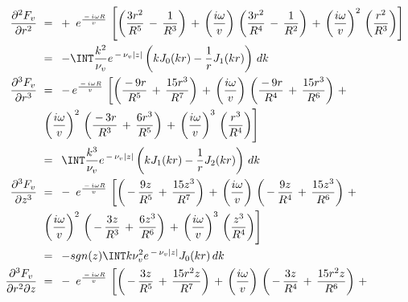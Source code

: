 \documentclass{article}
\begin{document}
\begin{equation*}
\begin{aligned}
{ \frac{ \partial^2 F_v   }{  \partial r^2 } } \   &= \  \,+\,\ { e^{ \frac{ \,-\,i \omega R   }{ v }} } \, \left[  \left( \frac{ 3 r^2   }{  R^5 } \,-\, \frac{ 1   }{  R^3 } \right)  \,+\, { \left( {\frac{ i \omega   }{ v }}  \right) } \,  \left( \frac{ 3 r^2   }{  R^4 } \,-\, \frac{ 1   }{  R^2 } \right)  \,+\, { \left( {\frac{ i \omega   }{ v }}  \right) }^2 \,  \left( \frac{ r^2   }{  R^3 } \right)  \right] \, \\
 \,&=\, \  - \INT  \frac{ k^2   }{  \nu_v } e^{ \,-\, \nu_v |  z | } \left( k J_0 ( kr ) - \frac{1 }{ r }J_1 ( kr )  \right) \, dk \\
{ \frac{ \partial^3 F_v   }{  \partial r^3 } } \   &= \ \,-\,  { e^{ \frac{ \,-\,i \omega R   }{ v }} } \, \left[  \left( \frac{\,-\,9r }{  R^5 } \,+\, \frac{ 15 r^3   }{  R^7 } \right)  \,+\, { \left( {\frac{ i \omega   }{ v }}  \right) } \,  \left( \frac{\,-\,9r }{  R^4 } \,+\, \frac{ 15 r^3   }{  R^6 } \right)  \,+\,  \right . \\
   &\left. { \left( {\frac{ i \omega   }{ v }}  \right) }^2 \,  \left( \frac{\,-\,3r }{  R^3 } \,+\, \frac{ 6 r^3   }{  R^5 } \right)  \,+\, { \left( {\frac{ i \omega   }{ v }}  \right) }^3 \,  \left( \frac{ r^3   }{  R^4 } \right)  \right] \, \\
 \,&=\, \   \INT  \frac{ k^3   }{  \nu_v } e^{ \,-\, \nu_v |  z | } \left( k J_1 ( kr ) - \frac{1 }{ r }J_2 ( kr )  \right) \, dk \\
{ \frac{ \partial^3 F_v   }{  \partial {\it z}^3 } } \   &= \  \,-\,\ { e^{ \frac{ \,-\,i \omega R   }{ v }} } \, \left[  \left( \, -\, \frac{ 9 z   }{  R^5 } \,+\, \frac{ 15   z^3   }{  R^7 } \right)  \,+\, { \left( {\frac{ i \omega   }{ v }}  \right) } \,  \left( \, -\, \frac{ 9 z   }{  R^4 } \,+\, \frac{ 15   z^3   }{  R^6 } \right)  \,+\,  \right . \\
 &\left. { \left( {\frac{ i \omega   }{ v }}  \right) }^2 \,  \left( \, -\, \frac{ 3 z   }{  R^3 } \,+\, \frac{ 6   z^3   }{  R^6 } \right)  \,+\, { \left( {\frac{ i \omega   }{ v }}  \right) }^3 \,  \left( \frac{   z^3   }{  R^4 } \right)  \right] \, \\
 \,&=\, \  - sgn (z) \INT  k \nu_v^2  e^{ \,-\, \nu_v |  z | } J_0 ( kr ) \, dk \\
{ \frac{ \partial^3 F_v   }{  \partial r^2 \partial {\it z} } } \   &= \  \,-\,\ { e^{ \frac{ \,-\,i \omega R   }{ v }} } \, \left[  \left( \,-\, \frac{ 3 z   }{  R^5 } \,+\, \frac{15 r^2   z   }{  R^7 } \right)  \,+\, { \left( {\frac{ i \omega   }{ v }}  \right) } \,  \left( \,-\, \frac{ 3 z   }{  R^4 } \,+\, \frac{15 r^2   z   }{  R^6 } \right)  \,+\, \right . \\

\end{aligned}
\end{equation*}
\end{document}

